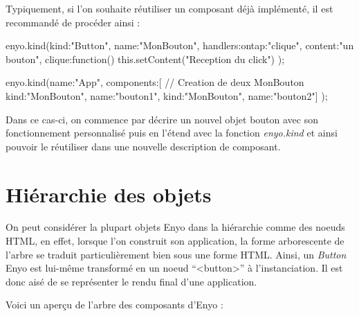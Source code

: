\documentclass[11pt,a4paper]{report}
\begin{document}
Typiquement, si l'on souhaite réutiliser un composant déjà implémenté,
il est recommandé de procéder ainsi :

\begin{JavaScript}
enyo.kind({kind:"Button", name:"MonBouton", 
           handlers:{ontap:"clique"}, 
           content:"un bouton",
           clique:function(){
             this.setContent("Reception du click")
           }
});

enyo.kind({name:"App", 
           components:[
             // Creation de deux MonBouton
             {kind:"MonBouton", name:"bouton1"},
             {kind:"MonBouton", name:"bouton2"}]
});
\end{JavaScript}

Dans ce cas-ci, on commence par décrire un nouvel objet bouton avec son fonctionnement
personnalisé puis en l'étend avec la fonction \emph{enyo.kind} et ainsi pouvoir le
réutiliser dans une nouvelle description de composant.

\section{Hiérarchie des objets}

On peut considérer la plupart objets Enyo dans la hiérarchie comme des noeuds HTML,
en effet, lorsque l'on construit son application, la forme arborescente de l'arbre se traduit
particulièrement bien sous une forme HTML. Ainsi, un \emph{Button} Enyo est lui-même transformé
en un noeud ``<button>'' à l'instanciation. Il est donc aisé de se représenter le rendu final 
d'une application.

Voici un aperçu de l'arbre des composants d'Enyo :\medskip

\end{document}
